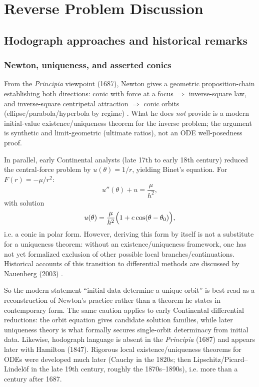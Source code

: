 \section{Reverse Problem Discussion}

\subsection{Hodograph approaches and historical remarks}

\subsubsection{Newton, uniqueness, and asserted conics}

From the \emph{Principia} viewpoint (1687), Newton gives a geometric proposition-chain establishing both directions: conic with force at a focus $\Rightarrow$ inverse-square law, and inverse-square centripetal attraction $\Rightarrow$ conic orbits (ellipse/parabola/hyperbola by regime) \cite{newton1687principia,chandrasekhar1995principia}. What he does \emph{not} provide is a modern initial-value existence/uniqueness theorem for the inverse problem; the argument is synthetic and limit-geometric (ultimate ratios), not an ODE well-posedness proof.

In parallel, early Continental analysts (late 17th to early 18th century) reduced the central-force problem by $u(\theta)=1/r$, yielding Binet's equation. For $F(r)=-\mu/r^2$:
\begin{equation}
  u''(\theta)+u=\frac{\mu}{h^2},
\end{equation}
with solution
\begin{equation}
  u(\theta)=\frac{\mu}{h^2}\Bigl(1+e\cos(\theta-\theta_0)\Bigr),
\end{equation}
i.e. a conic in polar form. However, deriving this form by itself is not a substitute for a uniqueness theorem: without an existence/uniqueness framework, one has not yet formalized exclusion of other possible local branches/continuations. Historical accounts of this transition to differential methods are discussed by Nauenberg (2003) \cite{nauenberg2003keplerarea}.

So the modern statement ``initial data determine a unique orbit'' is best read as a reconstruction of Newton's practice rather than a theorem he states in contemporary form. The same caution applies to early Continental differential reductions: the orbit equation gives candidate solution families, while later uniqueness theory is what formally secures single-orbit determinacy from initial data. Likewise, hodograph language is absent in the \emph{Principia} (1687) and appears later with Hamilton (1847). Rigorous local existence/uniqueness theorems for ODEs were developed much later (Cauchy in the 1820s; then Lipschitz/Picard--Lindel\"of in the late 19th century, roughly the 1870s--1890s), i.e. more than a century after 1687.

